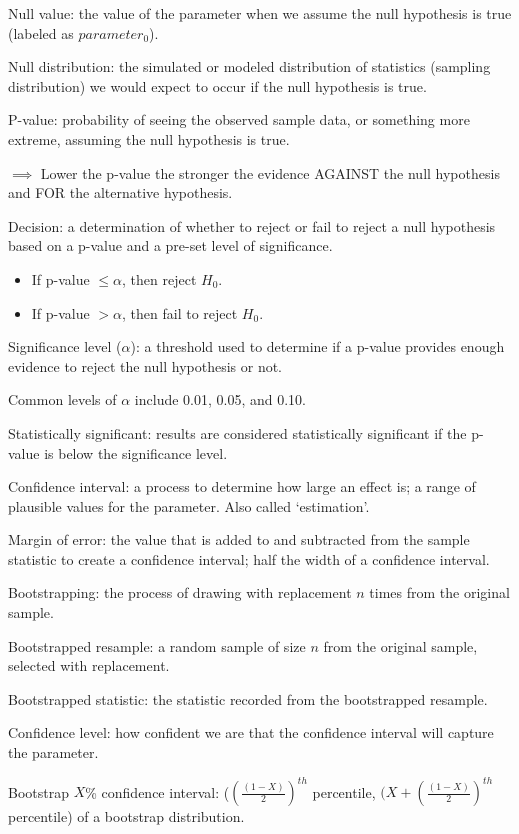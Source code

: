 \documentclass[
]{report}
\newcommand{\rgi}{\hspace{24pt}}  %
\begin{document}
Null value: the value of the parameter when we assume the null hypothesis is true (labeled as \(parameter_0\)).

Null distribution: the simulated or modeled distribution of statistics (sampling distribution) we would expect to occur if the null hypothesis is true.

P-value: probability of seeing the observed sample data, or something more extreme, assuming the null hypothesis is true.

\(\implies\) Lower the p-value the stronger the evidence AGAINST the null hypothesis and FOR the alternative hypothesis.

Decision: a determination of whether to reject or fail to reject a null hypothesis based on a p-value and a pre-set level of significance.

\begin{itemize}
\item
  If p-value \(\leq \alpha\), then reject \(H_0\).
\item
  If p-value \(> \alpha\), then fail to reject \(H_0\).
\end{itemize}

Significance level (\(\alpha\)): a threshold used to determine if a p-value provides enough evidence to reject the null hypothesis or not.

\rgi Common levels of \(\alpha\) include 0.01, 0.05, and 0.10.

Statistically significant: results are considered statistically significant if the p-value is below the significance level.

Confidence interval: a process to determine how large an effect is; a range of plausible values for the parameter. Also called `estimation'.

Margin of error: the value that is added to and subtracted from the sample statistic to create a confidence interval; half the width of a confidence interval.

Bootstrapping: the process of drawing with replacement \(n\) times from the original sample.

Bootstrapped resample: a random sample of size \(n\) from the original sample, selected with replacement.

Bootstrapped statistic: the statistic recorded from the bootstrapped resample.

Confidence level: how confident we are that the confidence interval will capture the parameter.

Bootstrap \(X\)\% confidence interval: (\((\frac{(1-X)}{2})^{th}\) percentile, \((X+(\frac{(1-X)}{2})^{th}\) percentile) of a bootstrap distribution.
\end{document}
